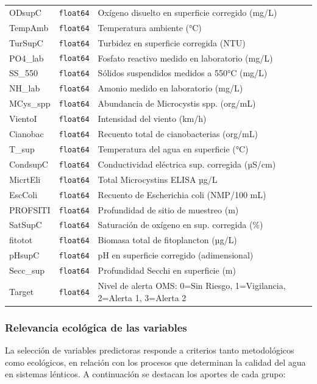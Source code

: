 \documentclass[
  11pt,
  pdftitle=TFI - Tschopp Joaquín S.,
  pdfauthor=Tschopp Joaquín S.,
  pdfcreator=LaTeX with hyperref,
]{report}  %
\begin{document}
\begin{longtable}{llp{8cm}}
ODsupC & \texttt{float64} & Oxígeno disuelto en superficie corregido (mg/L) \\
TempAmb & \texttt{float64} & Temperatura ambiente (°C) \\
TurSupC & \texttt{float64} & Turbidez en superficie corregida (NTU) \\
PO4\_lab & \texttt{float64} & Fosfato reactivo medido en laboratorio (mg/L) \\
SS\_550 & \texttt{float64} & Sólidos suspendidos medidos a 550°C (mg/L) \\
NH\_lab & \texttt{float64} & Amonio medido en laboratorio (mg/L) \\
MCys\_spp & \texttt{float64} & Abundancia de Microcystis spp. (org/mL) \\
VientoI & \texttt{float64} & Intensidad del viento (km/h) \\
Cianobac & \texttt{float64} & Recuento total de cianobacterias (org/mL) \\
T\_sup & \texttt{float64} & Temperatura del agua en superficie (°C) \\
CondsupC & \texttt{float64} & Conductividad eléctrica sup. corregida (µS/cm) \\
MicrtEli & \texttt{float64} & Total Microcystins ELISA µg/L \\
EscColi & \texttt{float64} & Recuento de Escherichia coli (NMP/100 mL) \\
PROFSITI & \texttt{float64} & Profundidad de sitio de muestreo (m) \\
SatSupC & \texttt{float64} & Saturación de oxígeno en sup. corregida (\%) \\
fitotot & \texttt{float64} & Biomasa total de fitoplancton (µg/L) \\
pHsupC & \texttt{float64} & pH en superficie corregido (adimensional) \\
Secc\_sup & \texttt{float64} & Profundidad Secchi en superficie (m) \\
\hline
Target & \texttt{float64} & Nivel de alerta OMS: 0=Sin Riesgo, 1=Vigilancia, 2=Alerta 1, 3=Alerta 2 \\
\end{longtable}

\subsubsection{Relevancia ecológica de las variables}

La selección de variables predictoras responde a criterios tanto metodológicos como ecológicos, en relación con los procesos que determinan la calidad del agua en sistemas lénticos. A continuación se destacan los aportes de cada grupo:
\end{document}
